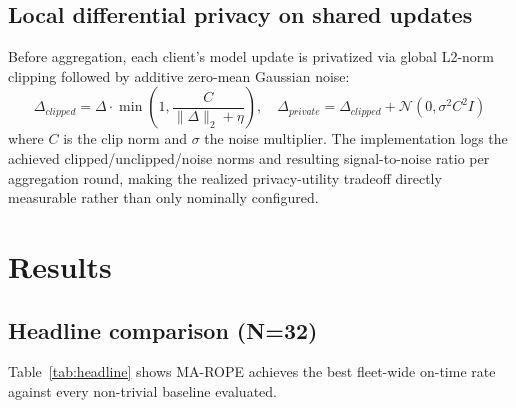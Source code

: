 \documentclass[journal,10pt,twocolumn]{IEEEtran}
\begin{document}
\subsection{Local differential privacy on shared updates}
Before aggregation, each client's model update is privatized via global L2-norm clipping followed
by additive zero-mean Gaussian noise:
\begin{equation}
\Delta_{clipped} = \Delta \cdot \min\left(1, \frac{C}{\|\Delta\|_2 + \eta}\right), \quad
\Delta_{private} = \Delta_{clipped} + \mathcal{N}(0, \sigma^2 C^2 I)
\end{equation}
where $C$ is the clip norm and $\sigma$ the noise multiplier. The implementation logs the achieved
clipped/unclipped/noise norms and resulting signal-to-noise ratio per aggregation round, making the
realized privacy-utility tradeoff directly measurable rather than only nominally configured.

\section{Results}
\label{sec:results}

\subsection{Headline comparison (N=32)}
Table~\ref{tab:headline} shows MA-ROPE achieves the best fleet-wide on-time rate against every
non-trivial baseline evaluated.

\begin{table}[t]
\centering
\caption{Headline comparison at N=32 (mean $\pm$ population std, 5 seeds)}
\label{tab:headline}
\end{table}
\end{document}
